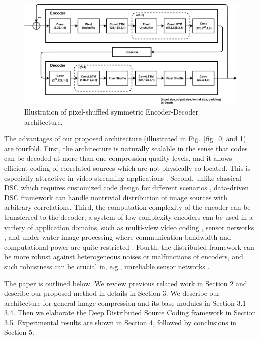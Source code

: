 \documentclass[10pt,twocolumn,letterpaper]{article}
\begin{document}
\begin{figure}
\begin{center}
\includegraphics[width=0.8\linewidth]{DeepEncoderDecoder.pdf}
\end{center}
   \caption{Illustration of pixel-shuffled symmetric Encoder-Decoder architecture.}
\label{fig_1}
\end{figure}
The advantages of our proposed architecture (illustrated in Fig.~\ref{fig_0} and \ref{fig_1}) are fourfold. 
First, the architecture is naturally scalable in the sense that codes can be decoded at more than one compression quality levels, and it allows efficient coding of correlated sources which are not physically co-located. This is especially attractive in video streaming applications \cite{guillemot2007distributed,gehrig2008distributed}. Second, unlike classical DSC which requires customized code design for different scenarios \cite{xiong2004distributed}, data-driven DSC framework can handle nontrivial distribution of image sources with arbitrary correlations. Third, the computation complexity of the encoder can be transferred to the decoder, a system of low complexity encoders can be used in a variety of application domains, such as multi-view video coding \cite{girod2005distributed}, sensor networks \cite{xiong2004distributed}, and under-water image processing where communication bandwidth and computational power are quite restricted \cite{stojanovic2009underwater,schettini2010underwater}. Fourth, the distributed framework can be more robust against heterogeneous noises or malfunctions of encoders, and such robustness can be crucial in, e.g., unreliable sensor networks \cite{girod2005distributed,ishwar2005rate,xiao2006distributed}.

The paper is outlined below. We review previous related work in Section 2 and describe our proposed method in details in Section 3. We describe our architecture for general image compression and its base modules in Section 3.1-3.4. Then we elaborate the Deep Distributed Source Coding framework in Section 3.5. Experimental results are shown in Section 4, followed by conclusions in Section 5.
\end{document}
